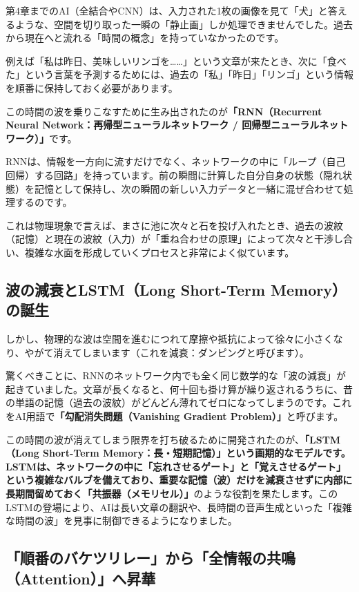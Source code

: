 第4章までのAI（全結合やCNN）は、入力された1枚の画像を見て「犬」と答えるような、空間を切り取った一瞬の「静止画」しか処理できませんでした。過去から現在へと流れる「時間の概念」を持っていなかったのです。

例えば「私は昨日、美味しいリンゴを\ldots{}\ldots{}」という文章が来たとき、次に「食べた」という言葉を予測するためには、過去の「私」「昨日」「リンゴ」という情報を順番に保持しておく必要があります。

この時間の波を乗りこなすために生み出されたのが\textbf{「RNN（Recurrent Neural Network：再帰型ニューラルネットワーク / 回帰型ニューラルネットワーク）」}です。

RNNは、情報を一方向に流すだけでなく、ネットワークの中に「ループ（自己回帰）する回路」を持っています。前の瞬間に計算した自分自身の状態（隠れ状態）を記憶として保持し、次の瞬間の新しい入力データと一緒に混ぜ合わせて処理するのです。

これは物理現象で言えば、まさに池に次々と石を投げ入れたとき、過去の波紋（記憶）と現在の波紋（入力）が「重ね合わせの原理」によって次々と干渉し合い、複雑な水面を形成していくプロセスと非常によく似ています。

\subsection{波の減衰とLSTM（Long Short-Term Memory）の誕生}

しかし、物理的な波は空間を進むにつれて摩擦や抵抗によって徐々に小さくなり、やがて消えてしまいます（これを減衰：ダンピングと呼びます）。

驚くべきことに、RNNのネットワーク内でも全く同じ数学的な「波の減衰」が起きていました。文章が長くなると、何十回も掛け算が繰り返されるうちに、昔の単語の記憶（過去の波紋）がどんどん薄れてゼロになってしまうのです。これをAI用語で\textbf{「勾配消失問題（Vanishing Gradient Problem）」}と呼びます。

この時間の波が消えてしまう限界を打ち破るために開発されたのが、\textbf{「LSTM（Long Short-Term Memory：長・短期記憶）」という画期的なモデルです。 LSTMは、ネットワークの中に「忘れさせるゲート」と「覚えさせるゲート」という複雑なバルブを備えており、重要な記憶（波）だけを減衰させずに内部に長期間留めておく「共振器（メモリセル）」}のような役割を果たします。このLSTMの登場により、AIは長い文章の翻訳や、長時間の音声生成といった「複雑な時間の波」を見事に制御できるようになりました。

\subsection{「順番のバケツリレー」から「全情報の共鳴（Attention）」へ昇華}

